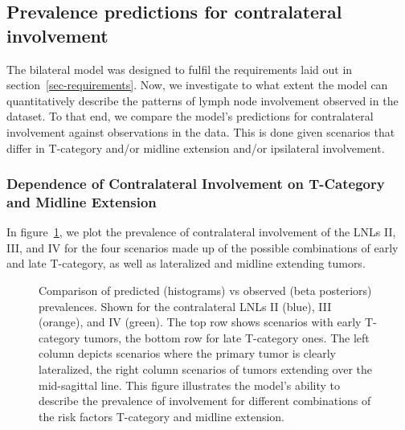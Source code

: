 \documentclass[
  sn-mathphys-num,
]{sn-jnl}
\begin{document}
\subsection{Prevalence predictions for contralateral
involvement}\label{prevalence-predictions-for-contralateral-involvement}

The bilateral model was designed to fulfil the requirements laid out in
section~\ref{sec-requirements}. Now, we investigate to what extent the
model can quantitatively describe the patterns of lymph node involvement
observed in the dataset. To that end, we compare the model's predictions
for contralateral involvement against observations in the data. This is
done given scenarios that differ in T-category and/or midline extension
and/or ipsilateral involvement.

\subsubsection{Dependence of Contralateral Involvement on T-Category and
Midline
Extension}\label{dependence-of-contralateral-involvement-on-t-category-and-midline-extension}

In figure~\ref{fig-model-prevalences-overall}, we plot the prevalence of
contralateral involvement of the LNLs II, III, and IV for the four
scenarios made up of the possible combinations of early and late
T-category, as well as lateralized and midline extending tumors.

\begin{figure}


\caption{\label{fig-model-prevalences-overall}Comparison of predicted
(histograms) vs observed (beta posteriors) prevalences. Shown for the
contralateral LNLs II (blue), III (orange), and IV (green). The top row
shows scenarios with early T-category tumors, the bottom row for late
T-category ones. The left column depicts scenarios where the primary
tumor is clearly lateralized, the right column scenarios of tumors
extending over the mid-sagittal line. This figure illustrates the
model's ability to describe the prevalence of involvement for different
combinations of the risk factors T-category and midline extension.}

\end{figure}%
\end{document}
